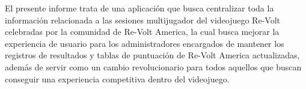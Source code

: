 El presente informe trata de una aplicación que busca centralizar toda la información relacionada a las sesiones multijugador del videojuego Re-Volt celebradas por la comunidad de Re-Volt America, la cual busca mejorar la experiencia de usuario para los administradores encargados de mantener los registros de resultados y tablas de puntuación de Re-Volt America actualizadas, además de servir como un cambio revolucionario para todos aquellos que buscan conseguir una experiencia competitiva dentro del videojuego. 
